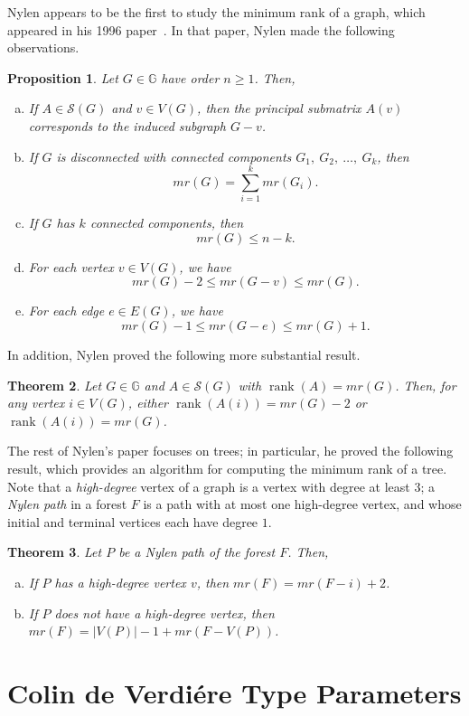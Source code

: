 \documentclass{article}
\newtheorem{theorem}{Theorem}[section]
\newtheorem{proposition}[theorem]{Proposition}
\theoremstyle{definition}
\newcommand\abs[1]{\left|#1\right|}
\newcommand\rank[1]{\operatorname{rank}\left(#1\right)}
\begin{document}
Nylen appears to be the first to study the minimum rank of a graph, which appeared in his 1996 paper~\cite{Nylen1996}.
In that paper, Nylen made the following observations.
\begin{proposition}\label{prop:nylen}
Let $G\in\mathbb{G}$ have order $n\geq 1$.
Then,
\begin{enumerate}[a.]
\item If $A\in\mathcal{S}(G)$ and $v\in V(G)$, then the principal submatrix $A(v)$ corresponds to the induced subgraph $G-v$.
\item If $G$ is disconnected with connected components $G_{1},~G_{2},~\ldots,~G_{k}$, then
\[
mr(G) = \sum_{i=1}^{k}mr(G_{i}).
\]
\item If $G$ has $k$ connected components, then
\[
mr(G) \leq n-k.
\]
\item For each vertex $v\in V(G)$, we have
\[
mr(G) - 2 \leq mr(G-v) \leq mr(G).
\]
\item For each edge $e\in E(G)$, we have
\[
mr(G) - 1 \leq mr(G-e) \leq mr(G) + 1.
\]
\end{enumerate}
\end{proposition}

In addition, Nylen proved the following more substantial result.
\begin{theorem}\label{thm:nylen}
Let $G\in\mathbb{G}$ and $A\in\mathcal{S}(G)$ with $\rank{A} = mr(G)$.
Then, for any vertex $i\in V(G)$, either $\rank{A(i)} = mr(G)-2$ or $\rank{A(i)} = mr(G)$.
\end{theorem}

The rest of Nylen's paper focuses on trees; in particular, he proved the following result, which provides an algorithm for computing the minimum rank of a tree.
Note that a \emph{high-degree} vertex of a graph is a vertex with degree at least $3$; a \emph{Nylen path} in a forest $F$ is a path with at most one high-degree vertex, and whose initial and terminal vertices each have degree $1$.
\begin{theorem}\label{thm:nylen2}
Let $P$ be a Nylen path of the forest $F$.
Then,
\begin{enumerate}[a.]
\item If $P$ has a high-degree vertex $v$, then $mr(F) = mr(F-i)+2$.
\item If $P$ does not have a high-degree vertex, then $mr(F) = \abs{V(P)}-1 + mr(F-V(P))$.
\end{enumerate}
\end{theorem}
\section{Colin de Verdi{\'e}re Type Parameters}
\label{Bibliography}


\end{document}
